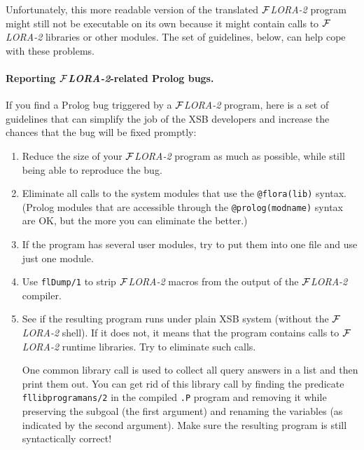 \documentclass[11pt]{article}
\newcommand{\FLORA}{{\mbox{${\cal F}${\small\it LORA}\rm\emph{-2}}}\xspace}
\begin{document}
Unfortunately, this more readable version of the translated \FLORA program
might still not be executable on its own because it might contain calls to
\FLORA libraries or other modules.  The set of guidelines, below, can help
cope with these problems.

\paragraph{Reporting \FLORA-related Prolog bugs.}
If you find a Prolog bug triggered by a \FLORA program, here is a set of
guidelines that can simplify the job of the XSB developers and increase the
chances that the bug will be fixed promptly:
\begin{enumerate}
  \item  Reduce the size of your \FLORA program as much as possible, while
    still being able to reproduce the bug.
  \item  Eliminate all calls to the system modules that use the
    {\tt @flora(lib)} syntax. (Prolog modules that are accessible
    through the {\tt @prolog(modname)} syntax are OK, but the more you can
    eliminate the better.)
  \item If the program has several user modules, try to put them into one
    file and use just one module. 
  \item  Use {\tt flDump/1} to strip \FLORA macros from the output of the
    \FLORA compiler.
  \item  See if the resulting program runs under plain XSB system (without
    the \FLORA shell). If it does not, it means that the program contains
    calls to \FLORA runtime libraries. Try to eliminate such calls.

    One common library call is used to collect all query answers in a list
    and then print them out. You can get rid of this library call by
    finding the predicate {\tt fllibprogramans/2} in the compiled {\tt .P}
    program and removing it while preserving the subgoal (the first
    argument) and renaming the variables (as indicated by the second argument).
    Make sure the resulting program is still syntactically correct!


\end{enumerate}
\end{document}
